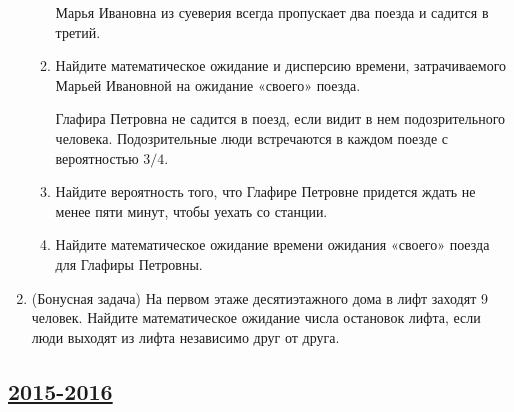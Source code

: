 \begin{enumerate}
\begin{enumerate}
Марья Ивановна из суеверия всегда пропускает два поезда и садится в третий.

\item	Найдите математическое ожидание и дисперсию времени,
затрачиваемого Марьей Ивановной на ожидание «своего» поезда.

Глафира Петровна не садится в поезд, если видит в нем подозрительного человека.
Подозрительные люди встречаются в каждом поезде с вероятностью $3/4$.

\item	Найдите вероятность того, что Глафире Петровне придется ждать не менее пяти минут,
чтобы уехать со станции.
\item	Найдите математическое ожидание времени ожидания «своего» поезда для Глафиры Петровны.
\end{enumerate}

\item (Бонусная задача)
На первом этаже десятиэтажного дома в лифт заходят 9 человек.
Найдите математическое ожидание числа остановок лифта, если люди выходят из лифта независимо друг от друга.
\end{enumerate}


\newpage
\subsection[2015-2016]{\hyperref[sec:sol_kr_01_2015_2016]{2015-2016}}
\label{sec:kr_01_2015_2016}


